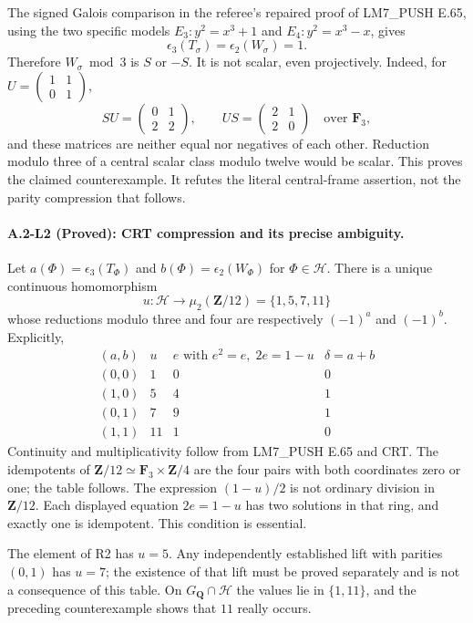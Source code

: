 The signed Galois comparison in the referee's repaired proof of
LM7\_PUSH E.65, using the two specific models
$E_3:y^2=x^3+1$ and $E_4:y^2=x^3-x$, gives
\[
 \epsilon_3(T_\sigma)=\epsilon_2(W_\sigma)=1.
\]
Therefore $W_\sigma\bmod3$ is $S$ or $-S$.  It is not scalar, even
projectively.  Indeed, for $U=\left(\begin{smallmatrix}1&1\\0&1\end{smallmatrix}\right)$,
\[
 SU=\begin{pmatrix}0&1\\2&2\end{pmatrix},\qquad
 US=\begin{pmatrix}2&1\\2&0\end{pmatrix}\quad\text{over }\mathbf F_3,
\]
and these matrices are neither equal nor negatives of each other.
Reduction modulo three of a central scalar class modulo twelve would be
scalar.  This proves the claimed counterexample.  It refutes the literal
central-frame assertion, not the parity compression that follows.

\paragraph{A.2-L2 (Proved): CRT compression and its precise ambiguity.}
Let $a(\Phi)=\epsilon_3(T_\Phi)$ and
$b(\Phi)=\epsilon_2(W_\Phi)$ for $\Phi\in\mathcal H$.
There is a unique continuous homomorphism
\[
 u:\mathcal H\longrightarrow\mu_2(\mathbf Z/12)
 =\{1,5,7,11\}
\]
whose reductions modulo three and four are respectively $(-1)^a$ and
$(-1)^b$.  Explicitly,
\[
\begin{array}{c|c|c|c}
(a,b)&u&e\text{ with }e^2=e,\;2e=1-u&\delta=a+b\\\hline
(0,0)&1&0&0\\
(1,0)&5&4&1\\
(0,1)&7&9&1\\
(1,1)&11&1&0
\end{array}
\]
Continuity and multiplicativity follow from LM7\_PUSH E.65 and CRT.
The idempotents of $\mathbf Z/12\simeq\mathbf F_3\times\mathbf Z/4$
are the four pairs with both coordinates zero or one; the table follows.
The expression $(1-u)/2$ is not ordinary division in $\mathbf Z/12$.
Each displayed equation $2e=1-u$ has two solutions in that ring, and
exactly one is idempotent.  This condition is essential.

The element of R2 has $u=5$.  Any independently established lift with
parities $(0,1)$ has $u=7$; the existence of that lift must be proved
separately and is not a consequence of this table.  On
$G_{\mathbf Q}\cap\mathcal H$ the values lie in $\{1,11\}$, and the
preceding counterexample shows that $11$ really occurs.

